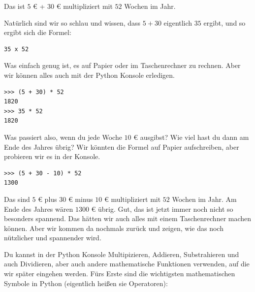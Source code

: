 Das ist $5$ € + $30$ € multipliziert mit $52$ Wochen im Jahr. \begin{samepage}Natürlich sind wir so schlau und wissen, dass $5 + 30$ eigentlich $35$ ergibt, und so ergibt sich die Formel:


\begin{verbatim}
35 x 52
\end{verbatim}
\end{samepage}

Was einfach genug ist, es auf Papier oder im Taschenrechner zu rechnen. Aber wir können alles auch mit der Python Konsole erledigen.

\begin{Verbatim}[frame=single]
>>> (5 + 30) * 52
1820
>>> 35 * 52
1820
\end{Verbatim}

Was passiert also, wenn du jede Woche $10$ € ausgibst? Wie viel hast du dann am Ende des Jahres übrig? Wir könnten die Formel auf Papier aufschreiben, aber probieren wir es in der Konsole.

\begin{Verbatim}[frame=single]
>>> (5 + 30 - 10) * 52
1300
\end{Verbatim}

Das sind $5$ € plus $30$ € minus $10$ € multipliziert mit $52$ Wochen im Jahr. Am Ende des Jahres wären $1300$ € übrig. Gut, das ist jetzt immer noch nicht so besonders spannend. Das hätten wir auch alles mit einem Taschenrechner machen können. Aber wir kommen da nochmals zurück und zeigen, wie das noch nützlicher und spannender wird.

Du kannst in der Python Konsole Multipizieren, Addieren, Substrahieren und auch Dividieren, aber auch andere mathematische Funktionen verwenden, auf die wir später eingehen werden. Fürs Erste sind die wichtigsten mathematischen Symbole in Python (eigentlich heißen sie Operatoren):

